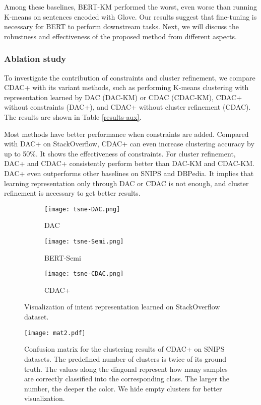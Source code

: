 \documentclass[letterpaper]{article} \usepackage{aaai20}  \usepackage{times}  \usepackage{helvet} \usepackage{courier}  \usepackage[hyphens]{url}  \usepackage{graphicx} \urlstyle{rm} \def\UrlFont{\rm}  \usepackage{graphicx}  \frenchspacing  \setlength{\pdfpagewidth}{8.5in}  \setlength{\pdfpageheight}{11in}
\begin{document}
Among these baselines, BERT-KM performed the worst, even worse than running K-means on sentences encoded with Glove. Our results suggest that fine-tuning is necessary for BERT to perform downstream tasks. Next, we will discuss the robustness and effectiveness of the proposed method from different aspects.

\subsubsection{Ablation study}
To investigate the contribution of constraints and cluster refinement, we compare CDAC+ with its variant methods, such as performing K-means clustering with representation learned by DAC (DAC-KM) or CDAC (CDAC-KM), CDAC+ without constraints (DAC+), and CDAC+ without cluster refinement (CDAC). The results are shown in Table \ref{results-aux}. 

Most methods have better performance when constraints are added. Compared with DAC+ on StackOverflow, CDAC+ can even increase clustering accuracy by up to 50\%. It shows the effectiveness of constraints. For cluster refinement, DAC+ and CDAC+ consistently perform better than DAC-KM and CDAC-KM. DAC+ even outperforms other baselines on SNIPS and DBPedia. It implies that learning representation only through DAC or CDAC is not enough, and cluster refinement is necessary to get better results.

\begin{figure*}[t]
\begin{subfigure}{.65\columnwidth}
    \centering
    \texttt{[image: tsne-DAC.png]}
    \caption{DAC}
\end{subfigure}
\begin{subfigure}{.65\columnwidth}
    \centering
    \texttt{[image: tsne-Semi.png]}
    \caption{BERT-Semi}
\end{subfigure}
\begin{subfigure}{.75\columnwidth}
    \centering
    \texttt{[image: tsne-CDAC.png]}
    \caption{CDAC+}
\end{subfigure}
\caption{Visualization of intent representation learned on StackOverflow dataset.}
\label{tsne2}
\end{figure*}


\begin{figure}[t!]
  \texttt{[image: mat2.pdf]}
\caption{ \label{mat} 
Confusion matrix for the clustering results of CDAC+ on SNIPS datasets. The predefined number of clusters is twice of its ground truth. The values along the diagonal represent how many samples are correctly classified into the corresponding class. The larger the number, the deeper the color. We hide empty clusters for better visualization.}
\end{figure}
\end{document}

